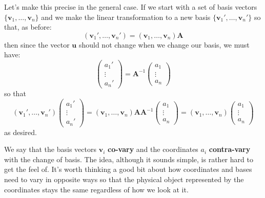 \documentclass[../master.tex]{subfiles}
\begin{document}
	Let's make this precise in the general case. If we start with a set of basis vectors $\{\mathbf v_1, \dots, \mathbf v_n\}$ and we make the linear transformation to a new basis $\{\mathbf v_1', \dots, \mathbf v_n' \}$ so that, as before:
	\begin{equation}\label{eq:CovariantTransform2}
		(\mathbf v_1', \dots, \mathbf v_n') = (\mathbf v_1, \dots, \mathbf v_n ) \mathbf A
	\end{equation}
	then since the vector $\mathbf u$ should not change when we change our basis, we must have: 
	\begin{equation}\label{eq:ContravariantTransform2}
		\begin{pmatrix}
			a_1' \\ \vdots \\ a_n'
		\end{pmatrix}
		= 
		\mathbf{A}^{-1}
		\begin{pmatrix}
			a_1 \\ \vdots \\ a_n
		\end{pmatrix}
	\end{equation}
	so that 
	\begin{equation*}
		(\mathbf v_1', \dots, \mathbf v_n') 
		\begin{pmatrix}
			a_1' \\ \vdots \\ a_n'
		\end{pmatrix} 
		= (\mathbf v_1, \dots, \mathbf v_n ) \mathbf A \mathbf A^{-1} 
		\begin{pmatrix}
			a_1 \\ \vdots \\ a_n
		\end{pmatrix}
		= (\mathbf v_1, \dots, \mathbf v_n ) 
		\begin{pmatrix}
			a_1 \\ \vdots \\ a_n
		\end{pmatrix}
	\end{equation*}
	as desired. 
	
	We say that the basis vectors $\mathbf v_i$ \textbf{co-vary} and the coordinates $a_i$ \textbf{contra-vary} with the change of basis. The idea, although it sounds simple, is rather hard to get the feel of. It's worth thinking a good bit about how coordinates and bases need to vary in opposite ways so that the physical object represented by the coordinates stays the same regardless of how we look at it. 
	
\end{document}
